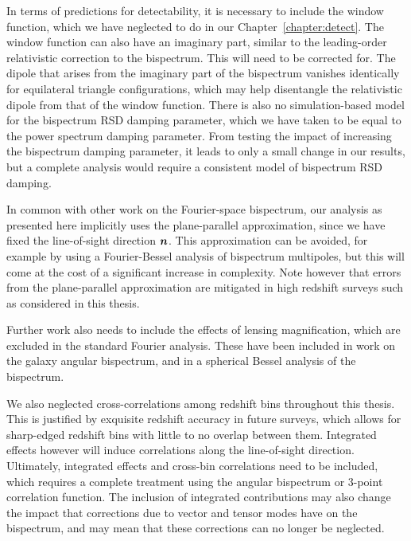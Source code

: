 In terms of predictions for detectability, it is necessary to include the window function, which we have neglected to do in our Chapter~\ref{chapter:detect}. The window function can also have an imaginary part, similar to the leading-order relativistic correction to the bispectrum. This will need to be corrected for. The dipole that arises from the imaginary part of the bispectrum vanishes identically for equilateral triangle configurations, which may help disentangle the relativistic dipole from that of the window function. There is also no simulation-based model for the bispectrum RSD damping parameter, which we have taken to be equal to the power spectrum damping parameter. From testing the impact of increasing the bispectrum damping parameter, it leads to only a small change in our results, but a complete analysis would require a consistent model of bispectrum RSD damping.

In common with other work on the Fourier-space bispectrum, our analysis as presented here implicitly uses the plane-parallel approximation, since we have fixed the line-of-sight direction $\bm {n}$. This approximation can be avoided, for example by using a Fourier-Bessel analysis of bispectrum multipoles, but this will come at the cost of a significant increase in complexity. Note however that errors from the plane-parallel approximation are mitigated in high redshift surveys such as considered in this thesis.

Further work also needs to include the effects of lensing magnification, which are excluded in the standard Fourier analysis. These have been included in work on the galaxy angular bispectrum, and in a spherical Bessel analysis of the bispectrum. 

We also neglected cross-correlations among redshift bins throughout this thesis. This is justified by exquisite redshift accuracy in future surveys, which allows for sharp-edged redshift bins with little to no overlap between them. Integrated effects however will induce correlations along the line-of-sight direction. Ultimately, integrated effects and cross-bin correlations need to be included, which requires a complete treatment using the angular bispectrum or 3-point correlation function. The inclusion of integrated contributions may also change the impact that corrections due to vector and tensor modes have on the bispectrum, and may mean that these corrections can no longer be neglected.

